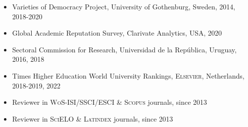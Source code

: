 





\begin{publications}

\begin{itemize}
\item{\small Varieties of Democracy Project, University of Gothenburg, Sweden, 2014, 2018-2020}
\item{\small Global Academic Reputation Survey, Clarivate Analytics, USA, 2020}
\item{\small Sectoral Commission for Research, Universidad de la Rep\'ublica, Uruguay, 2016, 2018}
\item{\small Times Higher Education World University Rankings, {\scshape Elsevier}, 
Netherlands, 2018-2019, 2022}
\item{\small Reviewer in {\scshape WoS-ISI/SSCI/ESCI} \& {\scshape Scopus} journals, since 2013}
\item{\small Reviewer in {\scshape SciELO} \& {\scshape Latindex} journals, since 2013}
\end{itemize}

\vspace{1mm}
\end{publications}
